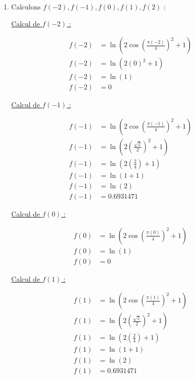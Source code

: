 \documentclass[12pt, letterpaper]{article}
\begin{document}
\begin{enumerate}
\item Calculons $f(-2), f(-1), f(0), f(1), f(2)$ :

  \underline{Calcul de $f(-2)$ :}
  
  \begin{equation*}
    \begin{split}
      f(-2) & = \ln(2\cos \left( \frac{\pi(-2)}{4} \right)^2 + 1) \\
      f(-2) & = \ln(2(0)^2 + 1) \\
      f(-2) & = \ln(1) \\
      f(-2) & = 0
    \end{split}
  \end{equation*}

  \underline{Calcul de $f(-1)$ :}
  
  \begin{equation*}
    \begin{split}
      f(-1) & = \ln(2\cos \left( \frac{\pi(-1)}{4} \right)^2 + 1) \\
      f(-1) & = \ln(2 \left( \frac{\sqrt{2}}{2} \right)^2 + 1) \\
      f(-1) & = \ln(2 \left( \frac{2}{4} \right) + 1) \\
      f(-1) & = \ln(1 + 1) \\
      f(-1) & = \ln(2) \\
      f(-1) & = 0.6931471
    \end{split}
  \end{equation*}

  \underline{Calcul de $f(0)$ :}
  
  \begin{equation*}
    \begin{split}
      f(0) & = \ln(2\cos \left( \frac{\pi(0)}{4} \right)^2 + 1) \\
      f(0) & = \ln(1) \\
      f(0) & = 0
    \end{split}
  \end{equation*}

  \underline{Calcul de $f(1)$ :}
  
  \begin{equation*}
    \begin{split}
      f(1) & = \ln(2\cos \left( \frac{\pi(1)}{4} \right)^2 + 1) \\
      f(1) & = \ln(2 \left( \frac{\sqrt{2}}{2} \right)^2 + 1) \\
      f(1) & = \ln(2 \left( \frac{2}{4} \right) + 1) \\
      f(1) & = \ln(1 + 1) \\
      f(1) & = \ln(2) \\
      f(1) & = 0.6931471
    \end{split}
  \end{equation*}


\end{enumerate}
\end{document}
